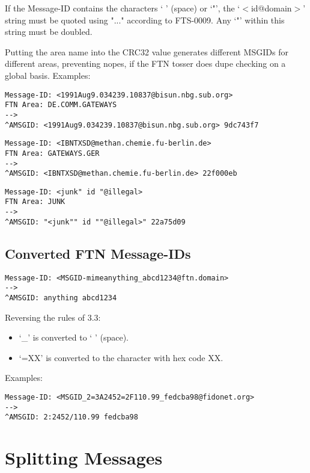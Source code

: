 \documentclass[letterpaper]{article}
\begin{document}
If the Message-ID contains the characters ` ' (space) or `"', the `$<$id@domain$>$' string must be quoted using "..." according to FTS-0009. Any `"' within this string must be doubled.

Putting the area name into the CRC32 value generates different MSGIDs for different areas, preventing nopes, if the FTN tosser does dupe checking on a global basis.  Examples:  
\begin{verbatim}
Message-ID: <1991Aug9.034239.10837@bisun.nbg.sub.org> 
FTN Area: DE.COMM.GATEWAYS 
--> 
^AMSGID: <1991Aug9.034239.10837@bisun.nbg.sub.org> 9dc743f7
\end{verbatim}




\begin{verbatim}
Message-ID: <IBNTXSD@methan.chemie.fu-berlin.de> 
FTN Area: GATEWAYS.GER 
--> 
^AMSGID: <IBNTXSD@methan.chemie.fu-berlin.de> 22f000eb
\end{verbatim}




\begin{verbatim}
Message-ID: <junk" id "@illegal> 
FTN Area: JUNK 
--> 
^AMSGID: "<junk"" id ""@illegal>" 22a75d09 
\end{verbatim}



\subsection{Converted FTN Message-IDs }

\begin{verbatim}
Message-ID: <MSGID-mimeanything_abcd1234@ftn.domain> 
--> 
^AMSGID: anything abcd1234 
\end{verbatim}


Reversing the rules of 3.3: 
\begin{itemize}
\item `\_' is converted to ` ' (space).  
\item `=XX' is converted to the character with hex code XX.   
\end{itemize}


Examples:  
\begin{verbatim}
Message-ID: <MSGID_2=3A2452=2F110.99_fedcba98@fidonet.org> 
--> 
^AMSGID: 2:2452/110.99 fedcba98 
\end{verbatim}



\section{Splitting Messages }
\end{document}
